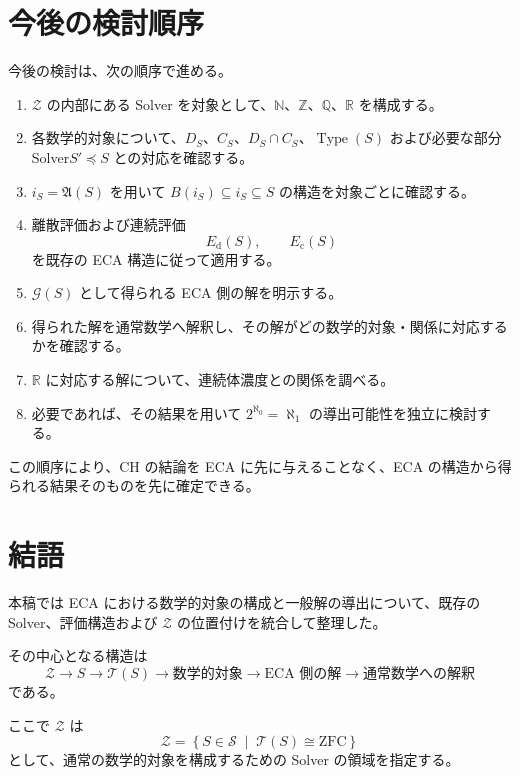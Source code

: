 \documentclass[a4paper,11pt]{article}
\begin{document}
\section{今後の検討順序}
\label{sec:future}

今後の検討は、次の順序で進める。

\begin{enumerate}[label=\arabic*.]
    \item $\mathcal{Z}$ の内部にある Solver を対象として、$\mathbb{N}$、$\mathbb{Z}$、$\mathbb{Q}$、$\mathbb{R}$ を構成する。
    \item 各数学的対象について、$D_S$、$C_S$、$D_S\cap C_S$、$\operatorname{Type}(S)$ および必要な部分 Solver$S'\preceq S$ との対応を確認する。
    \item $i_S=\mathfrak{A}(S)$ を用いて $B(i_S)\subseteq i_S\subseteq S$ の構造を対象ごとに確認する。

    \item 離散評価および連続評価
    \[
    E_{\mathrm d}(S),\qquad
    E_{\mathrm c}(S)
    \]
    を既存の ECA 構造に従って適用する。

    \item $\mathcal{G}(S)$ として得られる ECA 側の解を明示する。
    \item 得られた解を通常数学へ解釈し、その解がどの数学的対象・関係に対応するかを確認する。
    \item $\mathbb{R}$ に対応する解について、連続体濃度との関係を調べる。
    \item 必要であれば、その結果を用いて $2^{\aleph_0}=\aleph_1$ の導出可能性を独立に検討する。
\end{enumerate}

この順序により、CH の結論を ECA に先に与えることなく、ECA の構造から得られる結果そのものを先に確定できる。

\section{結語}
\label{sec:conclusion}

本稿では ECA における数学的対象の構成と一般解の導出について、既存の Solver、評価構造および $\mathcal{Z}$ の位置付けを統合して整理した。

その中心となる構造は
\[
\boxed{
\mathcal{Z}
\longrightarrow
S
\longrightarrow
\mathcal{T}(S)
\longrightarrow
\text{数学的対象}
\longrightarrow
\text{ECA 側の解}
\longrightarrow
\text{通常数学への解釈}}
\]
である。

ここで $\mathcal{Z}$ は
\[
\mathcal{Z}
=
\left\{
S\in\mathcal{S}
\;\middle|\;
\mathcal{T}(S)\cong\mathrm{ZFC}
\right\}
\]
として、通常の数学的対象を構成するための Solver の領域を指定する。
\end{document}
